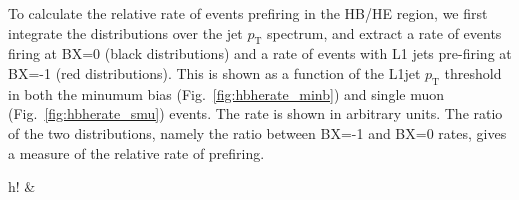 \documentclass[11pt]{cmspaperpdf}
\newcommand{\pt}{\ensuremath{p_{\mathrm{T}}}\xspace}
\begin{document}
To calculate the relative rate of events prefiring in the HB/HE region, we first integrate the distributions over the jet \pt spectrum, and extract a rate of events firing at BX=0 (black distributions) and a rate of events with L1 jets pre-firing at BX=-1 (red distributions). This is shown as a function of the L1jet \pt threshold in both the minumum bias (Fig.~\ref{fig:hbherate_minb}) and single muon (Fig.~\ref{fig:hbherate_smu}) events. The rate is shown in arbitrary units. The ratio of the two distributions, namely the ratio between BX=-1 and BX=0 rates, gives a measure of the relative rate of prefiring.

\begin{2figures}{h!}
\centering
{} &
 \\

\end{2figures}
\end{document}
